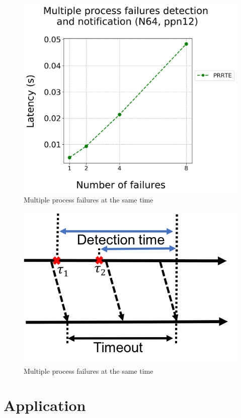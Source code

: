 \documentclass[sigconf]{acmart}
\begin{document}
\begin{figure}[h]
  \centering
  \includegraphics[width=\linewidth]{multi_failures.png}
  \caption{Multiple process failures at the same time}
\end{figure}

\begin{figure}[h]
  \centering
  \includegraphics[width=0.8\linewidth,frame]{failure_detection.png}
  \caption{Multiple process failures at the same time}
\end{figure}

\section{Application}
\end{document}
